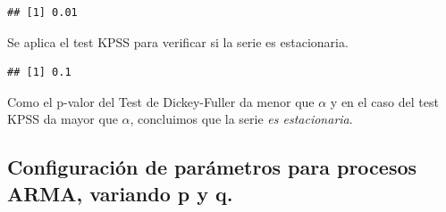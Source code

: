 \documentclass[
  11pt,
]{article}
\newenvironment{Shaded}{\begin{snugshade}}{\end{snugshade}}
\newcommand{\KeywordTok}[1]{\textcolor[rgb]{0.13,0.29,0.53}{\textbf{#1}}}
\newcommand{\NormalTok}[1]{#1}
\newcommand{\OperatorTok}[1]{\textcolor[rgb]{0.81,0.36,0.00}{\textbf{#1}}}
\begin{document}
\begin{Shaded}
\end{Shaded}

\begin{verbatim}
## [1] 0.01
\end{verbatim}

Se aplica el test KPSS para verificar si la serie es estacionaria.

\begin{Shaded}
\end{Shaded}

\begin{verbatim}
## [1] 0.1
\end{verbatim}

Como el p-valor del Test de Dickey-Fuller da menor que \(\alpha\) y en
el caso del test KPSS da mayor que \(\alpha\), concluimos que la serie
\emph{es estacionaria}.

\hypertarget{configuraciuxf3n-de-paruxe1metros-para-procesos-arma-variando-p-y-q.}{%
\subsection{Configuración de parámetros para procesos ARMA, variando p y
q.}\label{configuraciuxf3n-de-paruxe1metros-para-procesos-arma-variando-p-y-q.}}
\end{document}
